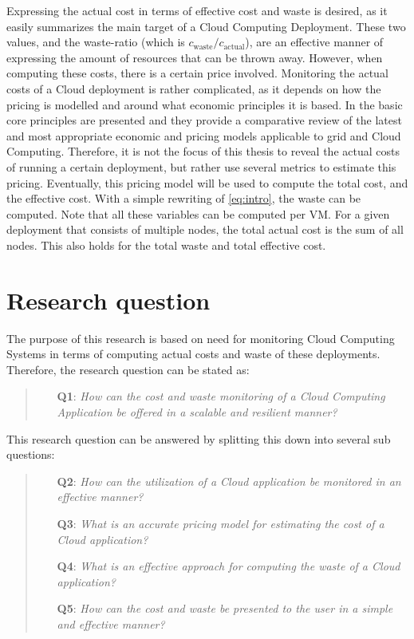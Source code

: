 \noindent
Expressing the actual cost in terms of effective cost and waste is desired, as it easily summarizes the main target of a Cloud Computing Deployment. These two values, and the waste-ratio (which is $c_\text{waste} / c_\text{actual}$), are an effective manner of expressing the amount of resources that can be thrown away. However, when computing these costs, there is a certain price involved. Monitoring the actual costs of a Cloud deployment is rather complicated, as it depends on how the pricing is modelled and around what economic principles it is based. In \cite{samimi2011review} the basic core principles are presented and they provide a comparative review of the latest and most appropriate economic and pricing models applicable to grid and Cloud Computing. Therefore, it is not the focus of this thesis to reveal the actual costs of running a certain deployment, but rather use several metrics to estimate this pricing. Eventually, this pricing model will be used to compute the total cost, and the effective cost. With a simple rewriting of \autoref{eq:intro}, the waste can be computed. Note that all these variables can be computed per VM. For a given deployment that consists of multiple nodes, the total actual cost is the sum of all nodes. This also holds for the total waste and total effective cost.

\section{Research question} \label{sec:research_question}
The purpose of this research is based on need for monitoring Cloud Computing Systems in terms of computing actual costs and waste of these deployments. Therefore, the research question can be stated as:

\begin{quote}
    \begin{itemize}
        \item[\textbf{Q1}: ]\textit{How can the cost and waste monitoring of a Cloud Computing Application be offered in a scalable and resilient manner?}
    \end{itemize}
\end{quote}

\noindent
This research question can be answered by splitting this down into several sub questions:

\begin{quote}
    \begin{itemize}
        \item[\textbf{Q2}: ]\textit{How can the utilization of a Cloud application be monitored in an effective manner?}
        \item[\textbf{Q3}: ]\textit{What is an accurate pricing model for estimating the cost of a Cloud application?}
        \item[\textbf{Q4}: ]\textit{What is an effective approach for computing the waste of a Cloud application?}
        \item[\textbf{Q5}: ]\textit{How can the cost and waste be presented to the user in a simple and effective manner?}
    \end{itemize}
\end{quote}

